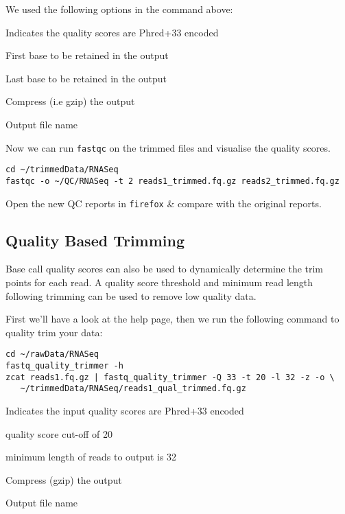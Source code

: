 \begin{note}
We used the following options in the command above:
\begin{description}[style=multiline,labelindent=0cm,align=right,leftmargin=0.8\descriptionlabelspace,rightmargin=1.5cm,font=\ttfamily]
\item[-Q 33] Indicates the quality scores are Phred+33 encoded
\item[-f 1] First base to be retained in the output
\item[-l 32] Last base to be retained in the output
\item[-z] Compress (i.e gzip) the output
\item[-o] Output file name
\end{description}
\end{note}

\begin{steps}
Now we can run \texttt{fastqc} on the trimmed files and visualise the quality scores.
\begin{lstlisting}
cd ~/trimmedData/RNASeq
fastqc -o ~/QC/RNASeq -t 2 reads1_trimmed.fq.gz reads2_trimmed.fq.gz
\end{lstlisting}
Open the new QC reports in \texttt{firefox} \& compare with the original reports.
\end{steps}


\subsection{Quality Based Trimming}
Base call quality scores can also be used to dynamically determine the trim points for each read. 
A quality score threshold and minimum read length following trimming can be used to remove low quality data. \\
\begin{steps}
First we'll have a look at the help page, then we  run the following command to quality trim your data:
\begin{lstlisting}
cd ~/rawData/RNASeq
fastq_quality_trimmer -h
zcat reads1.fq.gz | fastq_quality_trimmer -Q 33 -t 20 -l 32 -z -o \
   ~/trimmedData/RNASeq/reads1_qual_trimmed.fq.gz
\end{lstlisting}
\end{steps}

\begin{note}
\begin{description}[style=multiline,labelindent=0cm,align=right,leftmargin=0.8\descriptionlabelspace,rightmargin=1.5cm,font=\ttfamily]
\item[-Q 33] Indicates the input quality scores are Phred+33 encoded
\item[-t 20] quality score cut-off of 20
\item[-l 32] minimum length of reads to output is 32
\item[-z] Compress (gzip) the output
\item[-o] Output file name
\end{description}
\end{note}

